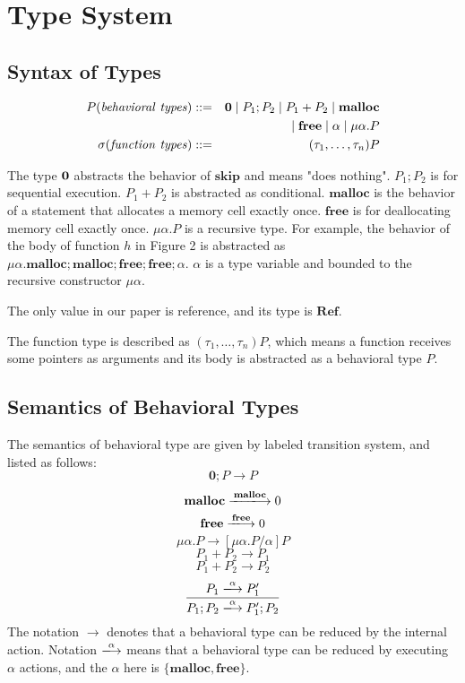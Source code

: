 \documentclass[english]{jssst_ppl} %
\newcommand\tB{\;|\;}
\newcommand\SKIP{\mathbf{skip}}
\newcommand\Malloc{\mathbf{malloc}}
\newcommand\Free{\mathbf{free}}
\theoremstyle{definition}
\begin{document}
\section{Type System}

\subsection{Syntax of Types}
     \begin{eqnarray*}
       P (\mathit{behavioral\ types})::=&& {\bf 0} \tB P_{1};P_{2} \tB P_{1}+P_{2} \tB \Malloc\\
       &&\tB \Free \tB \alpha \tB \mu\alpha.P \\
       \sigma (\mathit{function\ types})::=&& (\tau_{1},\dots, \tau_{n}) P
     \end{eqnarray*}

The type $\bf 0$ abstracts the behavior of $\SKIP$ and means "does nothing". $P_{1};P_{2}$ is for sequential execution. $P_{1} + P_{2}$ is abstracted as conditional. $\Malloc$ is the behavior of a statement that allocates a memory cell exactly once. $\Free$ is for deallocating memory cell exactly once. $\mu \alpha. P$ is a recursive type. For example, the behavior of  the body of function $h$ in Figure 2 is abstracted as $\mu \alpha. \Malloc;\Malloc;\Free;\Free;\alpha$. $\alpha$ is a type variable and bounded to the recursive constructor $\mu \alpha$.

The only value in our paper is reference, and its type is $\mathbf{Ref}$.

The function type is described as $(\tau_{1}, \dots, \tau_{n})P$, which means a function receives some pointers as arguments and its body is abstracted as a behavioral type $P$.

\subsection{Semantics of Behavioral Types}
The semantics of behavioral type are given by labeled transition system, and listed as follows:
    $$
        \mathbf{0};P \rightarrow P
    $$
    $$
          \Malloc \xlongrightarrow{\Malloc} 0
    $$
    $$
           \Free \xlongrightarrow{\Free} 0
    $$
    $$
          \mu \alpha.P \rightarrow  [\mu \alpha . P/\alpha]  P
    $$
   $$
          P_{1} + P_{2} \longrightarrow P_{1}
   $$
   $$
          P_{1} + P_{2} \longrightarrow P_{2}
   $$
   $$
           \frac{P_{1} \xlongrightarrow{\alpha} P_{1}' }
                 {P_{1};P_{2} \xlongrightarrow{\alpha} P_{1}';P_{2}}
   $$
The notation $\rightarrow$ denotes that a behavioral type can be reduced by the internal action. Notation $\xlongrightarrow{\alpha}$ means that a behavioral type can be reduced by executing $\alpha$ actions, and the $\alpha$ here is $\{\Malloc, \Free\}$.
\end{document}
